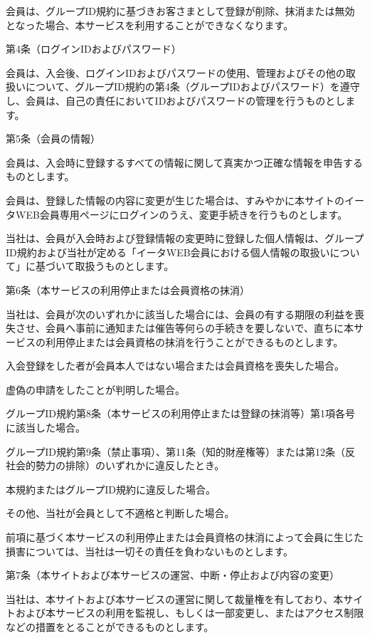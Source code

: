     会員は、グループID規約に基づきお客さまとして登録が削除、抹消または無効となった場合、本サービスを利用することができなくなります。

第4条（ログインIDおよびパスワード）

    会員は、入会後、ログインIDおよびパスワードの使用、管理およびその他の取扱いについて、グループID規約の第4条（グループIDおよびパスワード）を遵守し、会員は、自己の責任においてIDおよびパスワードの管理を行うものとします。

第5条（会員の情報）

    会員は、入会時に登録するすべての情報に関して真実かつ正確な情報を申告するものとします。

    会員は、登録した情報の内容に変更が生じた場合は、すみやかに本サイトのイータWEB会員専用ページにログインのうえ、変更手続きを行うものとします。

    当社は、会員が入会時および登録情報の変更時に登録した個人情報は、グループID規約および当社が定める「イータWEB会員における個人情報の取扱いについて」に基づいて取扱うものとします。

第6条（本サービスの利用停止または会員資格の抹消）

    当社は、会員が次のいずれかに該当した場合には、会員の有する期限の利益を喪失させ、会員へ事前に通知または催告等何らの手続きを要しないで、直ちに本サービスの利用停止または会員資格の抹消を行うことができるものとします。

        入会登録をした者が会員本人ではない場合または会員資格を喪失した場合。

        虚偽の申請をしたことが判明した場合。

        グループID規約第8条（本サービスの利用停止または登録の抹消等）第1項各号に該当した場合。

        グループID規約第9条（禁止事項）、第11条（知的財産権等）または第12条（反社会的勢力の排除）のいずれかに違反したとき。

        本規約またはグループID規約に違反した場合。

        その他、当社が会員として不適格と判断した場合。

    前項に基づく本サービスの利用停止または会員資格の抹消によって会員に生じた損害については、当社は一切その責任を負わないものとします。

第7条（本サイトおよび本サービスの運営、中断・停止および内容の変更）

    当社は、本サイトおよび本サービスの運営に関して裁量権を有しており、本サイトおよび本サービスの利用を監視し、もしくは一部変更し、またはアクセス制限などの措置をとることができるものとします。

